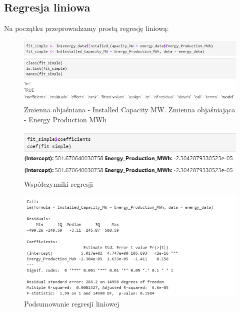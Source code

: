 \subsection{Regresja liniowa}
Na początku przeprowadzamy prostą regresję liniową:

\begin{figure}[H]
    \centering
    \includegraphics[width=1\linewidth]{lab1/obraz.png}
    \caption{Zmienna objaśniana - Installed Capacity MW. Zmienna objaśniająca - Energy Production MWh}
    \label{fig:regression}
\end{figure}

\begin{figure}[H]
        \includegraphics[width=0.9\linewidth]{lab1/obraz2.png}
    \caption{Współczynniki regresji}
    \label{fig:coefficients}
\end{figure}

\begin{figure}[H]
    \centering
    \includegraphics[width=1\linewidth]{lab1/obraz3.png}
    \caption{Podsumowanie regresji liniowej}
    \label{fig:summary}
\end{figure}

